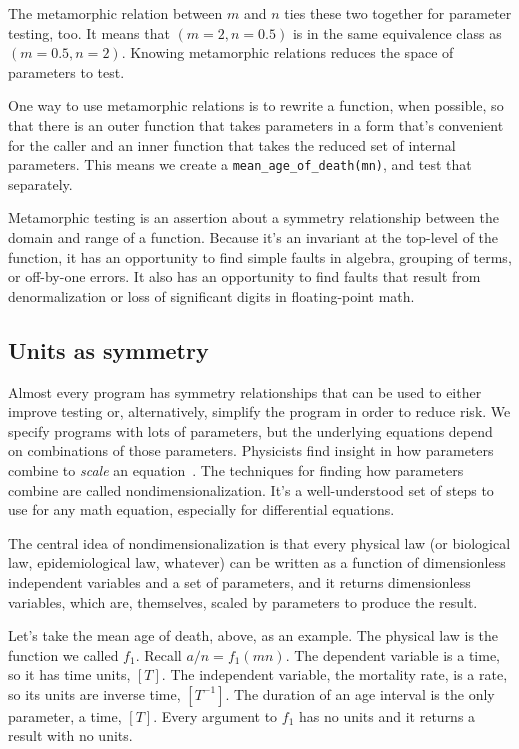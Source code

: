 \documentclass[fleqn,10pt]{olplainarticle}
\begin{document}
The metamorphic relation between $m$ and $n$ ties these two together
for parameter testing, too. It means that $(m=2, n=0.5)$ is in the same
equivalence class as $(m=0.5, n=2).$ Knowing
metamorphic relations reduces the space of parameters to test.

One way to use metamorphic relations is to rewrite a function, when possible,
so that there is an outer function that takes parameters in a form that's
convenient for the caller and an inner function that takes the reduced
set of internal parameters. This means we create a
\lstinline|mean_age_of_death(mn)|, and test that separately.

Metamorphic testing is an assertion about a symmetry relationship between
the domain and range of a function. Because it's an invariant at the top-level
of the function, it has an opportunity to find simple faults in algebra,
grouping of terms, or off-by-one errors. It also has an opportunity to
find faults that result from denormalization or loss of significant digits
in floating-point math.


\subsection{Units as symmetry}

Almost every program has symmetry relationships that can be used
to either improve testing or, alternatively, simplify the program in
order to reduce risk. We specify programs with lots of parameters,
but the underlying equations depend on combinations of those
parameters. Physicists find insight in how parameters combine
to \emph{scale} an equation~\citep{barenblatt1996}.
The techniques for finding how parameters combine are called
nondimensionalization. It's a
well-understood set of steps to use for any math equation, especially
for differential equations.

The central idea of nondimensionalization is that every physical
law (or biological law, epidemiological law, whatever) can be
written as a function of dimensionless independent variables
and a set of parameters, and it returns dimensionless variables,
which are, themselves, scaled by parameters to produce the result.

Let's take the mean age of death, above, as an example.
The physical law is the function we called $f_1$.
Recall $a/n = f_1(mn)$.
The dependent variable is a time, so it has time units, $[T]$.
The independent variable, the mortality rate, is a rate,
so its units are inverse time, $[T^{-1}]$.
The duration of an age interval is the only parameter, a time, $[T]$.
Every argument to $f_1$ has no units and it returns a result with no units.
\end{document}
